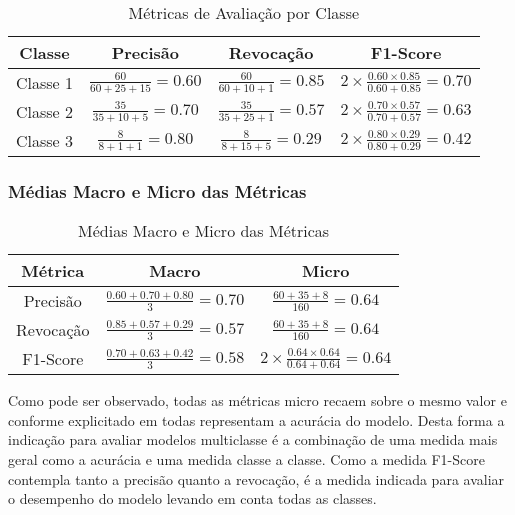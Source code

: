 \begin{table}[h]
\centering
\caption{Métricas de Avaliação por Classe}
\label{tab:detailed_evaluation_metrics}
\begin{tabular}{|c|c|c|c|}
\hline
\textbf{Classe} & \textbf{Precisão} & \textbf{Revocação} & \textbf{F1-Score} \\
\hline
Classe 1 & \( \frac{60}{60 + 25 + 15} = 0.60 \) & \( \frac{60}{60 + 10 + 1} = 0.85 \) & \( 2 \times \frac{0.60 \times 0.85}{0.60 + 0.85} = 0.70 \) \\
\hline
Classe 2 & \( \frac{35}{35 + 10 + 5} = 0.70 \) & \( \frac{35}{35 + 25 + 1} = 0.57 \) & \( 2 \times \frac{0.70 \times 0.57}{0.70 + 0.57} = 0.63 \) \\
\hline
Classe 3 & \( \frac{8}{8 + 1 + 1} = 0.80 \) & \( \frac{8}{8 + 15 + 5} = 0.29 \) & \( 2 \times \frac{0.80 \times 0.29}{0.80 + 0.29} = 0.42 \) \\
\hline
\end{tabular}
\end{table}

\subsubsection{Médias Macro e Micro das Métricas}

\begin{table}[h]
\centering
\caption{Médias Macro e Micro das Métricas}
\label{tab:macro_micro_averages}
\begin{tabular}{|c|c|c|}
\hline
\textbf{Métrica} & \textbf{Macro} & \textbf{Micro} \\
\hline
Precisão & \( \frac{0.60 + 0.70 + 0.80}{3} = 0.70 \) & \( \frac{60 + 35 + 8}{160} = 0.64 \) \\
\hline
Revocação & \( \frac{0.85 + 0.57 + 0.29}{3} = 0.57 \) & \( \frac{60 + 35 + 8}{160} = 0.64 \) \\
\hline
F1-Score & \( \frac{0.70 + 0.63 + 0.42}{3} = 0.58 \) & \( 2 \times \frac{0.64 \times 0.64}{0.64 + 0.64} = 0.64 \) \\
\hline
\end{tabular}
\end{table}

Como pode ser observado, todas as métricas micro recaem sobre o mesmo valor e conforme explicitado em \cite{grandini2020metrics} todas representam a acurácia do modelo. Desta forma a indicação para avaliar modelos multiclasse é a combinação de uma medida mais geral como a acurácia e uma medida classe a classe. Como a medida F1-Score contempla tanto a precisão quanto a revocação, é a medida indicada para avaliar o desempenho do modelo levando em conta todas as classes.

